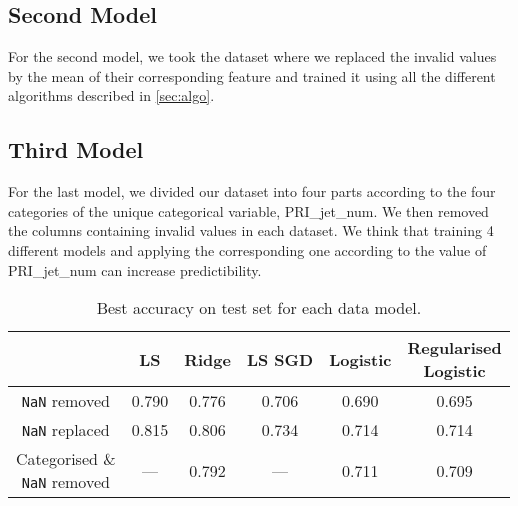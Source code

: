 \documentclass[10pt,conference,compsocconf]{IEEEtran}
\begin{document}
\subsection{Second Model}
For the second model, we took the dataset where we replaced the invalid values by the mean of their corresponding feature and trained it using all the different algorithms described in \autoref{sec:algo}.

\subsection{Third Model}
For the last model, we divided our dataset into four parts according to the four categories of the unique categorical variable, \textsf{PRI\_jet\_num}.
We then removed the columns containing invalid values in each dataset. We think that training 4 different models and applying the corresponding one according to the value of \textsf{PRI\_jet\_num} can increase predictibility.

\begin{table}[h!]
  \centering
  \begin{tabular}{ |c|c|c|c|c|c| } 
    \hline
     & LS & Ridge & LS SGD & Logistic & \makecell{Regularised  \\ Logistic } \\
    \hline
    \texttt{NaN} removed  & 0.790 & 0.776 & 0.706 & 0.690 & 0.695 \\
    \hline
    \texttt{NaN} replaced & 0.815 & 0.806 & 0.734 & 0.714 & 0.714 \\
    \hline
    \makecell{Categorised \& \\ \texttt{NaN} removed} & --- & 0.792 & --- & 0.711 & 0.709 \\
    \hline
  \end{tabular}
  \caption{Best accuracy on test set for each data model.}
  \label{tbl:algo-acc}
\end{table}


\end{document}
